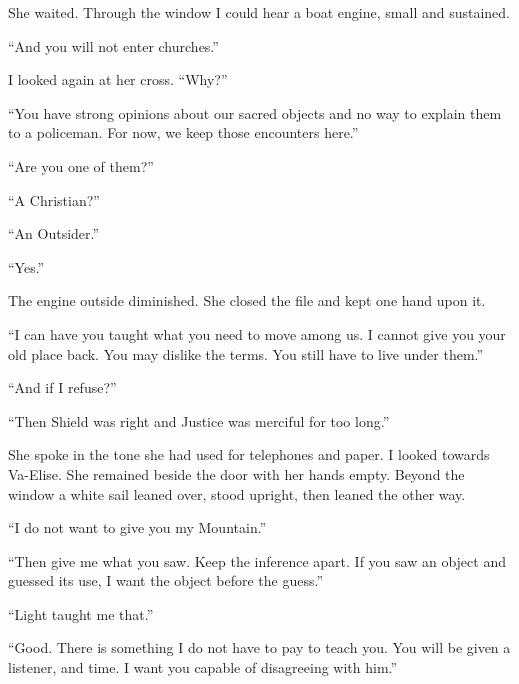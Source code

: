 She waited. Through the window I could hear a boat engine, small and sustained.\par

``And you will not enter churches.''\par

I looked again at her cross. ``Why?''\par

``You have strong opinions about our sacred objects and no way to explain them to a policeman. For now, we keep those encounters here.''\par

``Are you one of them?''\par

``A Christian?''\par

``An Outsider.''\par

``Yes.''\par

The engine outside diminished. She closed the file and kept one hand upon it.\par

``I can have you taught what you need to move among us. I cannot give you your old place back. You may dislike the terms. You still have to live under them.''\par

``And if I refuse?''\par

``Then Shield was right and Justice was merciful for too long.''\par

She spoke in the tone she had used for telephones and paper. I looked towards Va-Elise. She remained beside the door with her hands empty. Beyond the window a white sail leaned over, stood upright, then leaned the other way.\par

``I do not want to give you my Mountain.''\par

``Then give me what you saw. Keep the inference apart. If you saw an object and guessed its use, I want the object before the guess.''\par

``Light taught me that.''\par

``Good. There is something I do not have to pay to teach you. You will be given a listener, and time. I want you capable of disagreeing with him.''\par

